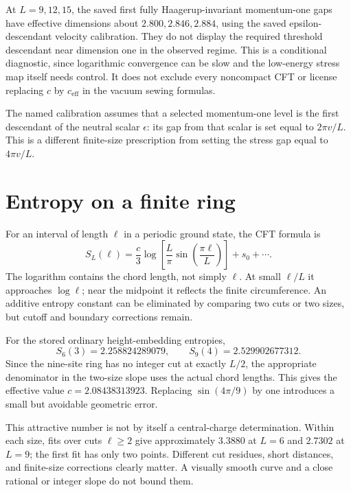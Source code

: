At $L=9,12,15$, the saved first fully Haagerup-invariant momentum-one
gaps have effective dimensions about $2.800,2.846,2.884$, using
the saved epsilon-descendant velocity calibration. They do not
display the required threshold descendant near dimension one in
the observed regime. This is a conditional diagnostic,
since logarithmic convergence can be slow and the low-energy
stress map itself needs control. It does not exclude every
noncompact CFT or license replacing $c$ by $c_{\mathrm{eff}}$ in
the vacuum sewing formulas.

The named calibration assumes that a selected momentum-one level is
the first descendant of the neutral scalar $\epsilon$: its gap from
that scalar is set equal to $2\pi v/L$. This is a different finite-size
prescription from setting the stress gap equal to $4\pi v/L$.

\section{Entropy on a finite ring}

For an interval of length $\ell$ in a periodic ground state, the CFT
formula is
\begin{equation}
 S_L(\ell)=\frac c3\log\left[\frac L\pi
       \sin\left(\frac{\pi\ell}L\right)\right]+s_0+\cdots.
 \label{eq:periodic-entropy}
\end{equation}
The logarithm contains the chord length, not simply $\ell$. At small
$\ell/L$ it approaches $\log\ell$; near the midpoint it reflects the
finite circumference. An additive entropy constant can be eliminated by
comparing two cuts or two sizes, but cutoff and boundary corrections
remain.

For the stored ordinary height-embedding entropies,
\[
 S_6(3)=2.258824289079,\qquad S_9(4)=2.529902677312.
\]
Since the nine-site ring has no integer cut at exactly $L/2$, the
appropriate denominator in the two-size slope uses the actual chord
lengths. This gives the effective value $c=2.08438313923$. Replacing
$\sin(4\pi/9)$ by one introduces a small but avoidable geometric error.

This attractive number is not by itself a central-charge determination.
Within each size, fits over cuts $\ell\geq2$ give approximately $3.3880$
at $L=6$ and $2.7302$ at $L=9$; the first fit has only two points.
Different cut residues, short distances, and finite-size corrections
clearly matter. A visually smooth curve and a close rational or integer
slope do not bound them.

